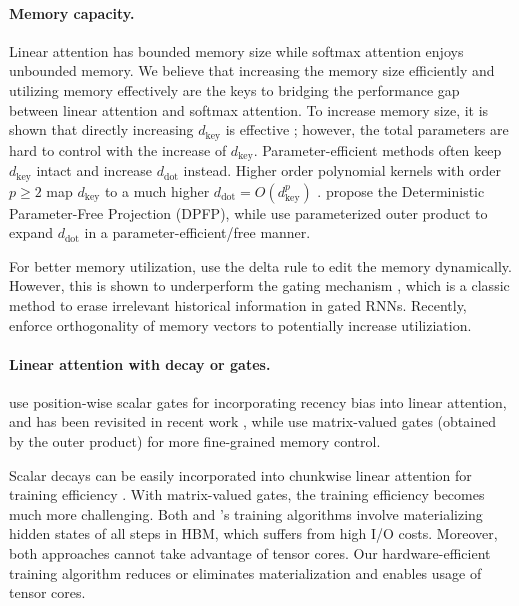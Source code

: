 \paragraph{Memory capacity.} 
 Linear attention has bounded memory size \cite{peng-etal-2022-abc} while softmax attention enjoys unbounded memory\cite{Oren2024TransformersAM}. We believe that increasing the memory size efficiently and utilizing memory effectively are the keys to bridging the performance gap between linear attention and softmax attention. To increase memory size, it is shown that  directly increasing $d_{\operatorname{key}}$ is effective \citep{sun2023retentive, mao-2022-fine, zhang-cai-2022-linearizing}; however, the total parameters are hard to control with the increase of $d_{\operatorname{key}}$.
 Parameter-efficient methods often keep $d_{\text{key}}$ intact and increase $d_{\text{dot}}$ instead. Higher order polynomial kernels with order $p\ge2$ map $d_{\text{key}}$ to a much higher  $d_{\text{dot}} = O(d_\text{key}^p)$ \citep{zoology, polysketch}.  \citet{linear-xmr-fastweight} propose the Deterministic Parameter-Free Projection (DPFP), while \citet{recurrent_linear_xfmr} use parameterized outer product to expand  $d_{\text{dot}}$ in a parameter-efficient/free manner. 
 
 For better memory utilization, \citet{linear-xmr-fastweight} use the delta rule to edit the memory dynamically. However, this is shown to underperform the gating mechanism \cite{mao-2022-fine}, which is a classic method to erase irrelevant historical information in gated RNNs. Recently, \citet{orthogonal_memory} enforce orthogonality of memory vectors to potentially increase utiliziation.

 \paragraph{Linear attention with decay or gates.} \citet{peng2021random} use position-wise scalar gates for incorporating recency bias into linear attention, and has been revisited in recent work \cite{mamba2, beck2024xlstm, Sun2024YouOC},
 while \citet{mao-2022-fine, recurrent_linear_xfmr} use matrix-valued gates (obtained by the outer product) for more fine-grained memory control. 
 

Scalar decays can be easily incorporated into chunkwise linear attention for training efficiency \citep{sun2023retentive, lightning2}. With matrix-valued gates, the training efficiency becomes much more challenging. 
 Both \citet{mao-2022-fine} and \citet{gatedloop}'s training algorithms involve materializing hidden states of all steps in HBM, which  suffers from high I/O costs. Moreover, both approaches cannot take advantage  of tensor cores. Our hardware-efficient training algorithm reduces or eliminates materialization and enables usage of tensor cores.


